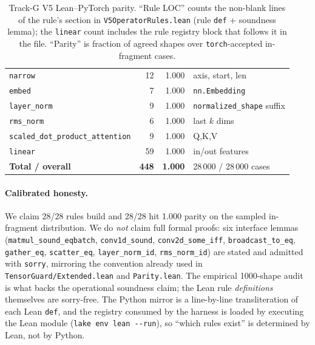 \begin{table}[h]
\begin{tabular}{lrrl}
\texttt{narrow}                       & 12 & 1.000 & axis, start, len \\
\texttt{embed}                        &  7 & 1.000 & \texttt{nn.Embedding} \\
\texttt{layer\_norm}                  &  9 & 1.000 & \texttt{normalized\_shape} suffix \\
\texttt{rms\_norm}                    &  6 & 1.000 & last $k$ dims \\
\texttt{scaled\_dot\_product\_attention} & 9 & 1.000 & Q,K,V \\
\texttt{linear}                       & 59 & 1.000 & in/out features \\
\midrule
\textbf{Total / overall}              & \textbf{448} & \textbf{1.000} & 28\,000 / 28\,000 cases \\
\bottomrule
\end{tabular}
\caption{Track-G V5 Lean--PyTorch parity. ``Rule LOC'' counts the
non-blank lines of the rule's section in
\texttt{V5OperatorRules.lean} (rule \texttt{def} + soundness lemma);
the \texttt{linear} count includes the rule registry block that
follows it in the file. ``Parity'' is fraction of agreed shapes over
\texttt{torch}-accepted in-fragment cases.}
\label{tab:lean-parity-v5}
\end{table}

\paragraph{Calibrated honesty.}
We claim 28/28 rules build and 28/28 hit 1.000 parity on the
sampled in-fragment distribution. We do \emph{not} claim full
formal proofs: six interface lemmas (\texttt{matmul\_sound\_eqbatch},
\texttt{conv1d\_sound}, \texttt{conv2d\_some\_iff},
\texttt{broadcast\_to\_eq}, \texttt{gather\_eq}, \texttt{scatter\_eq},
\texttt{layer\_norm\_id}, \texttt{rms\_norm\_id}) are stated and
admitted with \texttt{sorry}, mirroring the convention already used
in \texttt{TensorGuard/Extended.lean} and \texttt{Parity.lean}. The
empirical 1000-shape audit is what backs the operational soundness
claim; the Lean rule \emph{definitions} themselves are sorry-free.
The Python mirror is a line-by-line transliteration of each Lean
\texttt{def}, and the registry consumed by the harness is loaded by
executing the Lean module (\texttt{lake env lean -{}-run}), so
``which rules exist'' is determined by Lean, not by Python.
